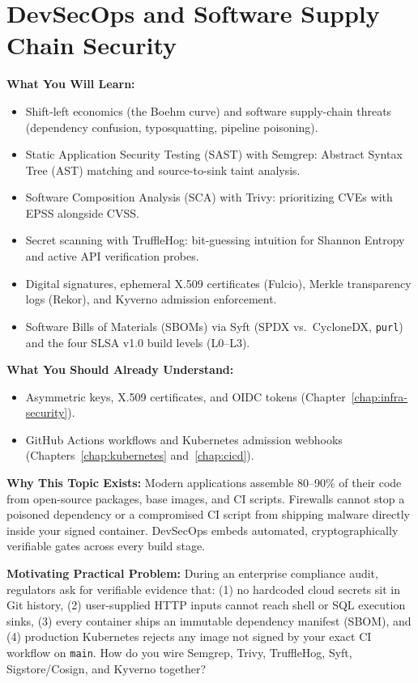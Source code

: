\chapter{DevSecOps and Software Supply Chain Security}
\label{chap:devsecops}

\begin{chaptergoalsbox}
\textbf{What You Will Learn:}
\begin{itemize}[leftmargin=12pt]
  \item Shift-left economics (the Boehm curve) and software supply-chain threats (dependency confusion, typosquatting, pipeline poisoning).
  \item Static Application Security Testing (SAST) with Semgrep: Abstract Syntax Tree (AST) matching and source-to-sink taint analysis.
  \item Software Composition Analysis (SCA) with Trivy: prioritizing CVEs with EPSS alongside CVSS.
  \item Secret scanning with TruffleHog: bit-guessing intuition for Shannon Entropy and active API verification probes.
  \item Digital signatures, ephemeral X.509 certificates (Fulcio), Merkle transparency logs (Rekor), and Kyverno admission enforcement.
  \item Software Bills of Materials (SBOMs) via Syft (SPDX vs.\ CycloneDX, \texttt{purl}) and the four SLSA v1.0 build levels (L0--L3).
\end{itemize}

\textbf{What You Should Already Understand:}
\begin{itemize}[leftmargin=12pt]
  \item Asymmetric keys, X.509 certificates, and OIDC tokens (Chapter~\ref{chap:infra-security}).
  \item GitHub Actions workflows and Kubernetes admission webhooks (Chapters~\ref{chap:kubernetes} and~\ref{chap:cicd}).
\end{itemize}

\textbf{Why This Topic Exists:}
Modern applications assemble 80--90\% of their code from open-source packages, base images, and CI scripts. Firewalls cannot stop a poisoned dependency or a compromised CI script from shipping malware directly inside your signed container. DevSecOps embeds automated, cryptographically verifiable gates across every build stage.

\textbf{Motivating Practical Problem:}
During an enterprise compliance audit, regulators ask for verifiable evidence that: (1) no hardcoded cloud secrets sit in Git history, (2) user-supplied HTTP inputs cannot reach shell or SQL execution sinks, (3) every container ships an immutable dependency manifest (SBOM), and (4) production Kubernetes rejects any image not signed by your exact CI workflow on \texttt{main}. How do you wire Semgrep, Trivy, TruffleHog, Syft, Sigstore/Cosign, and Kyverno together?
\end{chaptergoalsbox}

